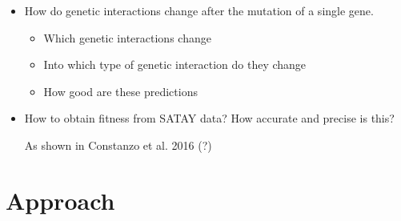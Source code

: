 \documentclass{article}
\begin{document}
\begin{itemize}
    \item How do genetic interactions change after the mutation of a single gene.
         \begin{itemize}
             \item Which genetic interactions change
             \item Into which type of genetic interaction do they change
             \item How good are these predictions
        \end{itemize}
   \item How to obtain fitness from SATAY data? How accurate and precise is this? %
   
   As shown in Constanzo et al. 2016 (?) 

\end{itemize}





    
    
        

\section{Approach}
\end{document}
